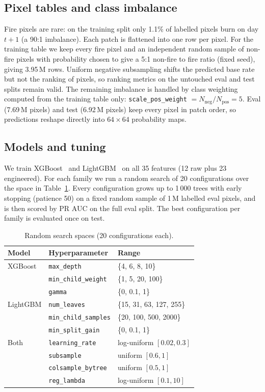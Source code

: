 \subsection{Pixel tables and class imbalance}
Fire pixels are rare: on the training split only 1.1\% of labelled pixels burn on day $t+1$
(a 90:1 imbalance). Each patch is flattened into one row per pixel. For the training table we
keep every fire pixel and an independent random sample of non-fire pixels with probability chosen
to give a 5:1 non-fire to fire ratio (fixed seed), giving 3.95\,M rows.
Uniform negative subsampling shifts the predicted base rate but not the ranking of pixels,
so ranking metrics on the untouched eval and test splits remain valid.
The remaining imbalance is handled by class weighting computed from the training table only:
\texttt{scale\_pos\_weight} $= N_{\text{neg}}/N_{\text{pos}} = 5$.
Eval (7.69\,M pixels) and test (6.92\,M pixels) keep every pixel in patch order, so predictions
reshape directly into $64\times64$ probability maps.

\subsection{Models and tuning}
We train XGBoost~\cite{chen2016} and LightGBM~\cite{ke2017} on all 35 features (12 raw plus 23
engineered). For each family we run a random search of 20 configurations over the space in
Table~\ref{tab:space}. Every configuration grows up to 1\,000 trees with early stopping
(patience 50) on a fixed random sample of 1\,M labelled eval pixels, and is then scored by
PR AUC on the full eval split. The best configuration per family is evaluated once on test.

\begin{table}[t]
\centering
\caption{Random search spaces (20 configurations each).}
\label{tab:space}
\begin{tabular}{lll}
\hline
Model & Hyperparameter & Range \\
\hline
XGBoost & \texttt{max\_depth} & \{4, 6, 8, 10\} \\
 & \texttt{min\_child\_weight} & \{1, 5, 20, 100\} \\
 & \texttt{gamma} & \{0, 0.1, 1\} \\
LightGBM & \texttt{num\_leaves} & \{15, 31, 63, 127, 255\} \\
 & \texttt{min\_child\_samples} & \{20, 100, 500, 2000\} \\
 & \texttt{min\_split\_gain} & \{0, 0.1, 1\} \\
Both & \texttt{learning\_rate} & log-uniform $[0.02, 0.3]$ \\
 & \texttt{subsample} & uniform $[0.6, 1]$ \\
 & \texttt{colsample\_bytree} & uniform $[0.5, 1]$ \\
 & \texttt{reg\_lambda} & log-uniform $[0.1, 10]$ \\
\hline
\end{tabular}
\end{table}

